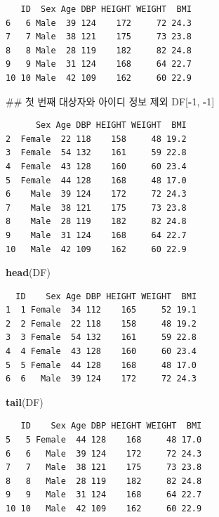 \documentclass[11pt,a4paper]{book}
\newenvironment{Shaded}{\begin{snugshade}}{\end{snugshade}}
\newcommand{\KeywordTok}[1]{\textcolor[rgb]{0.13,0.29,0.53}{\textbf{#1}}}
\newcommand{\DecValTok}[1]{\textcolor[rgb]{0.00,0.00,0.81}{#1}}
\newcommand{\OperatorTok}[1]{\textcolor[rgb]{0.81,0.36,0.00}{\textbf{#1}}}
\newcommand{\NormalTok}[1]{#1}
\theoremstyle{definition}
\theoremstyle{definition}
\theoremstyle{definition}
\theoremstyle{remark}
\begin{document}
\begin{verbatim}
   ID  Sex Age DBP HEIGHT WEIGHT  BMI
6   6 Male  39 124    172     72 24.3
7   7 Male  38 121    175     73 23.8
8   8 Male  28 119    182     82 24.8
9   9 Male  31 124    168     64 22.7
10 10 Male  42 109    162     60 22.9
\end{verbatim}

\begin{Shaded}
\begin{Highlighting}[]
\NormalTok{## 첫 번째 대상자와 아이디 정보 제외}
\NormalTok{DF[}\OperatorTok{-}\DecValTok{1}\NormalTok{, }\OperatorTok{-}\DecValTok{1}\NormalTok{]}
\end{Highlighting}
\end{Shaded}

\begin{verbatim}
      Sex Age DBP HEIGHT WEIGHT  BMI
2  Female  22 118    158     48 19.2
3  Female  54 132    161     59 22.8
4  Female  43 128    160     60 23.4
5  Female  44 128    168     48 17.0
6    Male  39 124    172     72 24.3
7    Male  38 121    175     73 23.8
8    Male  28 119    182     82 24.8
9    Male  31 124    168     64 22.7
10   Male  42 109    162     60 22.9
\end{verbatim}

\begin{Shaded}
\begin{Highlighting}[]
\KeywordTok{head}\NormalTok{(DF)}
\end{Highlighting}
\end{Shaded}

\begin{verbatim}
  ID    Sex Age DBP HEIGHT WEIGHT  BMI
1  1 Female  34 112    165     52 19.1
2  2 Female  22 118    158     48 19.2
3  3 Female  54 132    161     59 22.8
4  4 Female  43 128    160     60 23.4
5  5 Female  44 128    168     48 17.0
6  6   Male  39 124    172     72 24.3
\end{verbatim}

\begin{Shaded}
\begin{Highlighting}[]
\KeywordTok{tail}\NormalTok{(DF)}
\end{Highlighting}
\end{Shaded}

\begin{verbatim}
   ID    Sex Age DBP HEIGHT WEIGHT  BMI
5   5 Female  44 128    168     48 17.0
6   6   Male  39 124    172     72 24.3
7   7   Male  38 121    175     73 23.8
8   8   Male  28 119    182     82 24.8
9   9   Male  31 124    168     64 22.7
10 10   Male  42 109    162     60 22.9
\end{verbatim}
\end{document}
